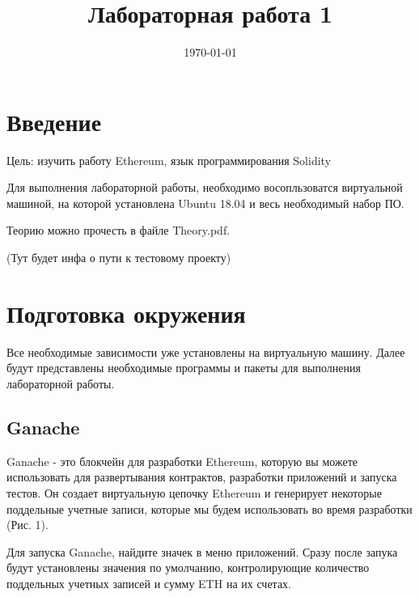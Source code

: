 \documentclass{article}
\begin{document}
\title{Лабораторная работа 1}

\date{\today}
\maketitle


\section{Введение}

Цель: изучить работу Ethereum, язык программирования Solidity


Для выполнения лабораторной работы, необходимо восопльзоватся виртуальной машиной, на которой установлена Ubuntu 18.04 и весь необходимый набор ПО.

Теорию можно прочесть в файле Theory.pdf.

(Тут будет инфа о пути к тестовому проекту)


\section{Подготовка окружения}

Все необходимые зависимости уже установлены на виртуальную машину. Далее будут представлены необходимые программы и пакеты для выполнения лабораторной работы. 

\subsection{Ganache}

Ganache - это блокчейн для разработки Ethereum, которую вы можете использовать для развертывания контрактов, разработки приложений и запуска тестов. Он создает виртуальную цепочку Ethereum и генерирует некоторые поддельные учетные записи, которые мы будем использовать во время разработки (Рис. 1).

Для запуска Ganache, найдите значек в меню приложений. Сразу после запука будут установлены значения по умолчанию, контролирующие количество поддельных учетных записей и сумму ETH на их счетах.
\end{document}
